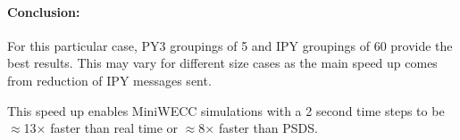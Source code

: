 \documentclass[12pt]{article}
\begin{document}
\paragraph{Conclusion:}
For this particular case, PY3 groupings of 5 and IPY groupings of 60 provide the best results. This may vary for different size cases as the main speed up comes from reduction of IPY messages sent.

This speed up enables MiniWECC simulations with a 2 second time steps to be $\approx$13$\times$ faster than real time or $\approx$8$\times$ faster than PSDS.
\end{document}
